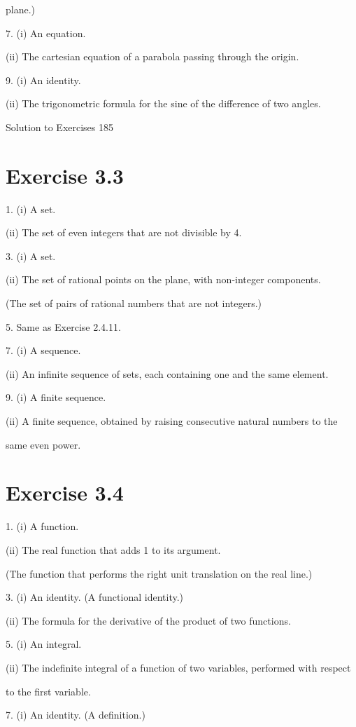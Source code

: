 \documentclass[11pt]{article}
\theoremstyle{plain}
\theoremstyle{definition}
\begin{document}
plane.)

7. (i) An equation.

(ii) The cartesian equation of a parabola passing through the origin.

9. (i) An identity.

(ii) The trigonometric formula for the sine of the difference of two angles.

Solution to Exercises 185

\section{Exercise 3.3}

1. (i) A set.

(ii) The set of even integers that are not divisible by 4.

3. (i) A set.

(ii) The set of rational points on the plane, with non-integer components.

(The set of pairs of rational numbers that are not integers.)

5. Same as Exercise 2.4.11.

7. (i) A sequence.

(ii) An infinite sequence of sets, each containing one and the same element.

9. (i) A finite sequence.

(ii) A finite sequence, obtained by raising consecutive natural numbers to the

same even power.

\section{Exercise 3.4}

1. (i) A function.

(ii) The real function that adds 1 to its argument.

(The function that performs the right unit translation on the real line.)

3. (i) An identity. (A functional identity.)

(ii) The formula for the derivative of the product of two functions.

5. (i) An integral.

(ii) The indefinite integral of a function of two variables, performed with respect

to the first variable.

7. (i) An identity. (A definition.)
\end{document}
